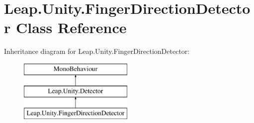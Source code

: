 \hypertarget{class_leap_1_1_unity_1_1_finger_direction_detector}{}\section{Leap.\+Unity.\+Finger\+Direction\+Detector Class Reference}
\label{class_leap_1_1_unity_1_1_finger_direction_detector}
Inheritance diagram for Leap.\+Unity.\+Finger\+Direction\+Detector\+:\begin{figure}[H]
\begin{center}
\leavevmode
\includegraphics[height=3.000000cm]{class_leap_1_1_unity_1_1_finger_direction_detector}
\end{center}
\end{figure}
